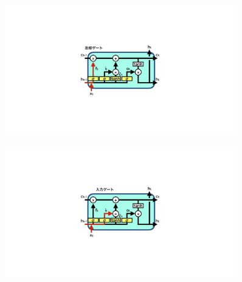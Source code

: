 \begin{figure}[h]
 \centering
  \begin{minipage}{1.0\textwidth}
  \centering
   \begin{minipage}{0.48\textwidth}
    \centering
    \includegraphics[trim = 600 300 600 300, width=0.9\textwidth, clip]{Figure/2DeepLearning/12ForgetGate.png}
    \label{12ForgetGate}
   \end{minipage}
   \begin{minipage}{0.48\textwidth}
   \centering
    \includegraphics[trim = 600 300 600 300, width=0.9\textwidth, clip]{Figure/2DeepLearning/13InputGate.png}
    \label{13InputGate}
   \end{minipage}
  \end{minipage}
  

\end{figure}
